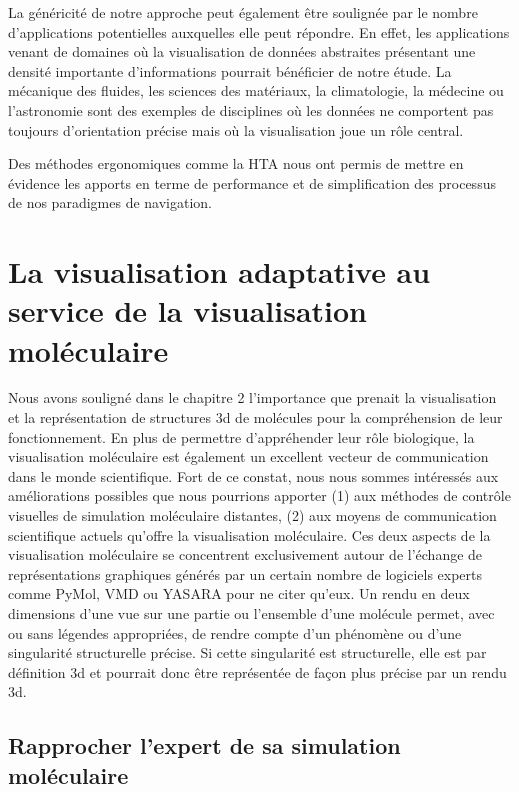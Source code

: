 La généricité de notre approche peut également être soulignée par le nombre d'applications potentielles auxquelles elle peut répondre. En effet, les applications venant de domaines où la visualisation de données abstraites présentant une densité importante d'informations pourrait bénéficier de notre étude. La mécanique des fluides, les sciences des matériaux, la climatologie, la médecine ou l'astronomie sont des exemples de disciplines où les données ne comportent pas toujours d'orientation précise mais où la visualisation joue un rôle central.

Des méthodes ergonomiques comme la HTA nous ont permis de mettre en évidence les apports en terme de performance et de simplification des processus de nos paradigmes de navigation. 


\section{La visualisation adaptative au service de la visualisation moléculaire}

Nous avons souligné dans le chapitre 2 l'importance que prenait la visualisation et la représentation de structures 3d de molécules pour la compréhension de leur fonctionnement. En plus de permettre d'appréhender leur rôle biologique, la visualisation moléculaire est également un excellent vecteur de communication dans le monde scientifique. Fort de ce constat, nous nous sommes intéressés aux améliorations possibles que nous pourrions apporter (1) aux méthodes de contrôle visuelles de simulation moléculaire distantes, (2) aux moyens de communication scientifique actuels qu'offre la visualisation moléculaire. Ces deux aspects de la visualisation moléculaire se concentrent exclusivement autour de l'échange de représentations graphiques générés par un certain nombre de logiciels experts comme PyMol, VMD ou YASARA pour ne citer qu'eux. Un rendu en deux dimensions d'une vue sur une partie ou l'ensemble d'une molécule permet, avec ou sans légendes appropriées, de rendre compte d'un phénomène ou d'une singularité structurelle précise. Si cette singularité est structurelle, elle est par définition 3d et pourrait donc être représentée de façon plus précise par un rendu 3d.

\subsection{Rapprocher l'expert de sa simulation moléculaire}

